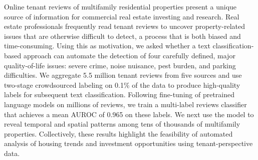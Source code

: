 Online tenant reviews of multifamily residential properties present a unique source of information for commercial real estate investing and research. Real estate professionals frequently read tenant reviews to uncover property-related issues that are otherwise difficult to detect, a process that is both biased and time-consuming. Using this as motivation, we asked whether a text classification-based approach can automate the detection of four carefully defined, major quality-of-life issues: severe crime, noise nuisance, pest burden, and parking difficulties. We aggregate 5.5 million tenant reviews from five sources and use two-stage crowdsourced labeling on 0.1\% of the data to produce high-quality labels for subsequent text classification. Following fine-tuning of pretrained language models on millions of reviews, we train a multi-label reviews classifier that achieves a mean AUROC of 0.965 on these labels. We next use the model to reveal temporal and spatial patterns among tens of thousands of multifamily properties. Collectively, these results highlight the feasibility of automated analysis of housing trends and investment opportunities using tenant-perspective data.
